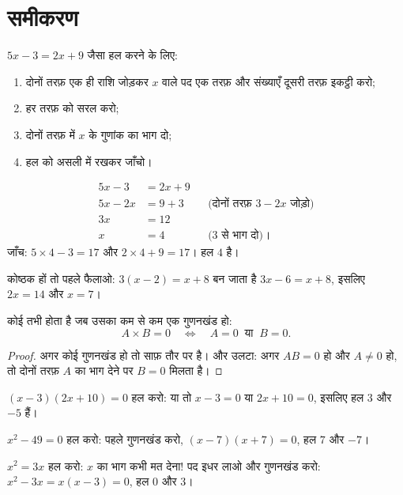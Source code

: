 \section{समीकरण}

\begin{method}\label{met:g9:algebra:firstdegree}
$5x - 3 = 2x + 9$ जैसा  हल करने के लिए:
\begin{enumerate}
  \item दोनों तरफ़ एक ही राशि जोड़कर $x$ वाले पद एक तरफ़ और संख्याएँ
        दूसरी तरफ़ इकट्ठी करो;
  \item हर तरफ़ को सरल करो;
  \item दोनों तरफ़ में $x$ के गुणांक का भाग दो;
  \item हल को असली  में रखकर जाँचो।
\end{enumerate}
\end{method}

\begin{example}\label{ex:g9:algebra:firstdegree}
\begin{align*}
5x - 3 &= 2x + 9 \\
5x - 2x &= 9 + 3 && \text{(दोनों तरफ़ $3 - 2x$ जोड़ो)}\\
3x &= 12 \\
x &= 4 && \text{($3$ से भाग दो)।}
\end{align*}
जाँच: $5 \times 4 - 3 = 17$ और $2 \times 4 + 9 = 17$। हल $4$ है।

कोष्ठक हों तो पहले फैलाओ: $3(x - 2) = x + 8$ बन जाता है
$3x - 6 = x + 8$, इसलिए $2x = 14$ और $x = 7$।
\end{example}

\begin{theorem}[शून्य-गुणनफल नियम]\label{thm:g9:algebra:zeroproduct}
कोई   तभी होता है जब उसका कम से कम एक गुणनखंड  हो:
\[
A \times B = 0
\quad\Longleftrightarrow\quad
A = 0 \ \text{ या } \ B = 0 .
\]
\end{theorem}

\begin{proof}
अगर कोई गुणनखंड  हो तो  साफ़ तौर पर  है। और उलटा: अगर
$A B = 0$ हो और $A \neq 0$ हो, तो दोनों तरफ़ $A$ का भाग देने पर
$B = 0$ मिलता है।
\end{proof}

\begin{example}\label{ex:g9:algebra:zeroproduct}
$(x - 3)(2x + 10) = 0$ हल करो: या तो $x - 3 = 0$ या $2x + 10 = 0$,
इसलिए हल $3$ और $-5$ हैं।

$x^2 - 49 = 0$ हल करो: पहले गुणनखंड करो, $(x-7)(x+7) = 0$, हल $7$ और
$-7$।

$x^2 = 3x$ हल करो: $x$ का भाग कभी मत देना! पद इधर लाओ और गुणनखंड करो:
$x^2 - 3x = x(x - 3) = 0$, हल $0$ और $3$।
\end{example}

